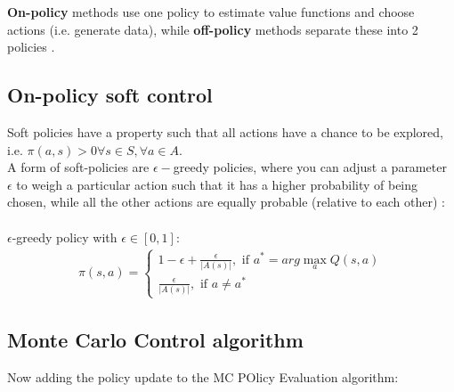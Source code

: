 

\textbf{On-policy} methods use one policy to estimate value functions and choose actions (i.e. generate data), while \textbf{off-policy} methods separate these into 2 policies \cite{lecture_mfc}. 

\subsection{On-policy soft control}

Soft policies have a property such that all actions have a chance to be explored, i.e. $\pi(a, s) > 0 \forall s \in S, \forall a \in A.$\\

A form of soft-policies are $\epsilon-$greedy policies, where 
you can adjust a parameter $\epsilon$ to weigh a particular action such that it has a higher probability of being chosen,
while all the other actions are equally probable (relative to each other) \cite{lecture_mfc}:\\\\
$\epsilon$-greedy policy with $\epsilon \in [0, 1]$:
\begin{align}
    \pi(s, a) = \begin{cases} 
        1 - \epsilon + \frac{\epsilon}{|A(s)|}, \text{ if } a^{*} = arg \max_{a} Q(s, a) \\
        \frac{\epsilon}{|A(s)|}, \text{ if }  a \neq a^*
    \end{cases}   
\end{align}

\subsection{Monte Carlo Control algorithm}

Now adding the policy update to the MC POlicy Evaluation algorithm:


